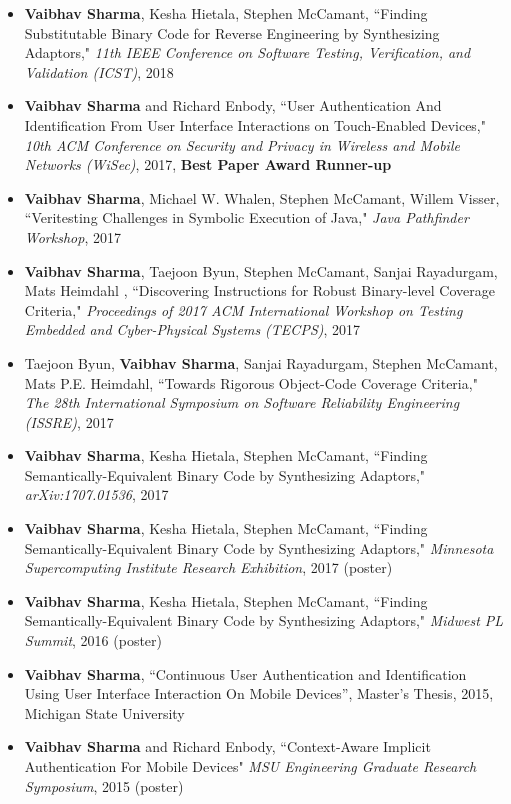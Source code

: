\documentclass[letterpaper,10pt]{article}
\begin{document}
\begin{itemize}
\item
{\bf Vaibhav Sharma}, Kesha Hietala, Stephen McCamant, ``Finding Substitutable Binary Code for Reverse Engineering by Synthesizing Adaptors," \textit{11th IEEE Conference on Software Testing, Verification, and Validation (ICST)}, 2018
\item
{\bf Vaibhav Sharma} and Richard Enbody, ``User Authentication And Identification From User Interface Interactions on Touch-Enabled Devices," \textit{10th ACM Conference on Security and Privacy in Wireless and Mobile Networks (WiSec)}, 2017, {\bf Best Paper Award Runner-up}
\item
{\bf Vaibhav Sharma}, Michael W. Whalen, Stephen McCamant, Willem Visser, ``Veritesting Challenges in Symbolic Execution of Java," \textit{Java Pathfinder Workshop}, 2017
\item
{\bf Vaibhav Sharma}, Taejoon Byun, Stephen McCamant, Sanjai Rayadurgam, Mats Heimdahl , ``Discovering Instructions for Robust Binary-level Coverage Criteria," \textit{Proceedings of 2017 ACM International Workshop on Testing Embedded and Cyber-Physical Systems (TECPS)}, 2017
\item
Taejoon Byun, {\bf Vaibhav Sharma}, Sanjai Rayadurgam, Stephen McCamant, Mats P.E. Heimdahl, ``Towards Rigorous Object-Code Coverage Criteria," \textit{The 28th International Symposium on Software Reliability Engineering (ISSRE)}, 2017
\item
{\bf Vaibhav Sharma}, Kesha Hietala, Stephen McCamant, ``Finding Semantically-Equivalent Binary Code by Synthesizing Adaptors," \textit{arXiv:1707.01536}, 2017
\item
{\bf Vaibhav Sharma}, Kesha Hietala, Stephen McCamant, ``Finding Semantically-Equivalent Binary Code by Synthesizing Adaptors," \textit{Minnesota Supercomputing Institute Research Exhibition}, 2017 (poster) 
\item
{\bf Vaibhav Sharma}, Kesha Hietala, Stephen McCamant, ``Finding Semantically-Equivalent Binary Code by Synthesizing Adaptors," \textit{Midwest PL Summit}, 2016 (poster) 
\item
{\bf Vaibhav Sharma}, ``Continuous User Authentication and Identification Using User Interface Interaction On Mobile Devices'', Master's Thesis, 2015, Michigan State University
\item 
{\bf Vaibhav Sharma} and Richard Enbody, ``Context-Aware Implicit Authentication For Mobile Devices" \textit{MSU Engineering Graduate Research Symposium}, 2015 (poster) 
\end{itemize}
\end{document}
